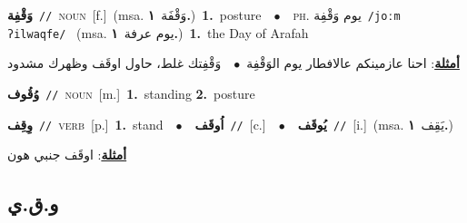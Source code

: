 \documentclass[10pt,a4paper,twoside]{article} %
\begin{document}
\begin{multicols}{2}
{\setlength\topsep{0pt}\textbf{\foreignlanguage{arabic}{وَقْفِة}}\ {\color{gray}\texttt{//}\color{black}}\ \textsc{noun}\ [f.]\ \color{gray}(msa. \foreignlanguage{arabic}{وَقْفَة}~\foreignlanguage{arabic}{\textbf{١.}})\color{black}\ \textbf{1.}~posture\ \ $\bullet$\ \ \textsc{ph.} \color{gray} \foreignlanguage{arabic}{يوم وَقْفِة}\color{black}\ {\color{gray}\texttt{/{\sffamily joːm ʔilwaqfe}/}\color{black}}\ \color{gray} (msa. \foreignlanguage{arabic}{يوم عرفة}~\foreignlanguage{arabic}{\textbf{١.}})\color{black}\ \textbf{1.}~the Day of Arafah\  \begin{flushright}\color{gray}\foreignlanguage{arabic}{\textbf{\underline{\foreignlanguage{arabic}{أمثلة}}}: احنا عازمينكم عالافطار يوم الوَقْفِة\ $\bullet$\ \  وَقْفِتك غلط، حاول اوقَف وظهرك مشدود}\end{flushright}\color{black}} \vspace{2mm}

{\setlength\topsep{0pt}\textbf{\foreignlanguage{arabic}{وُقُوف}}\ {\color{gray}\texttt{//}\color{black}}\ \textsc{noun}\ [m.]\ \textbf{1.}~standing  \textbf{2.}~posture\ } \vspace{2mm}

{\setlength\topsep{0pt}\textbf{\foreignlanguage{arabic}{وِقِف}}\ {\color{gray}\texttt{//}\color{black}}\ \textsc{verb}\ [p.]\ \textbf{1.}~stand\ \ $\bullet$\ \ \setlength\topsep{0pt}\textbf{\foreignlanguage{arabic}{اُوقَف}}\ {\color{gray}\texttt{//}\color{black}}\ [c.]\ \ $\bullet$\ \ \setlength\topsep{0pt}\textbf{\foreignlanguage{arabic}{يُوقَف}}\ {\color{gray}\texttt{//}\color{black}}\ [i.]\ \color{gray}(msa. \foreignlanguage{arabic}{يَقِف}~\foreignlanguage{arabic}{\textbf{١.}})\color{black}\  \begin{flushright}\color{gray}\foreignlanguage{arabic}{\textbf{\underline{\foreignlanguage{arabic}{أمثلة}}}: اوقَف جنبي هون}\end{flushright}\color{black}} \vspace{2mm}

\vspace{-3mm}
\subsection*{\color{blue}\foreignlanguage{arabic}{و.ق.ي}\color{blue}{}} 


\end{multicols}
\end{document}
